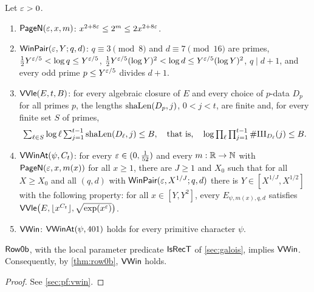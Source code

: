 \begin{definition}\label{def:window:vwin}
Let $\varepsilon>0$.
\begin{enumerate}[label=(\alph*)]
\item $\mathsf{PageN}(\varepsilon,x,m)$: $x^{2+8\varepsilon}\le2^m\le2x^{2+8\varepsilon}$.
\item $\mathsf{WinPair}(\varepsilon,Y;q,d)$: $q\equiv3\pmod8$ and $d\equiv7\pmod{16}$ are primes,
  $\frac12Y^{\varepsilon/5}<\log q\le Y^{\varepsilon/5}$, $\frac12Y^{\varepsilon/5}(\log Y)^2<\log d\le Y^{\varepsilon/5}(\log Y)^2$,
  $q\mid d+1$, and every odd prime $p\le Y^{\varepsilon/5}$ divides $d+1$.
\item $\mathsf{VVle}(E,t,B)$: for every algebraic closure of $E$ and every choice of $p$-data $D_p$ for all
  primes $p$, the lengths $\mathrm{shaLen}(D_p,j)$, $0<j<t$, are finite and, for every finite set $S$ of primes,
  \[\textstyle\sum_{\ell\in S}\log\ell\sum_{j=1}^{t-1}\mathrm{shaLen}(D_\ell,j)\le B,\quad\text{that is,}\quad
  \log\prod_{\ell}\prod_{j=1}^{t-1}\#\mathrm{III}_{D_\ell}(j)\le B.\]
\item $\mathsf{VWinAt}(\psi,C_t)$: for every $\varepsilon\in(0,\frac1{52})$ and every $m:\mathbb{R}\to\mathbb{N}$ with
  $\mathsf{PageN}(\varepsilon,x,m(x))$ for all $x\ge1$, there are $J\ge1$ and $X_0$ such that for all $X\ge X_0$ and all
  $(q,d)$ with $\mathsf{WinPair}(\varepsilon,X^{1/J};q,d)$ there is $Y\in[X^{1/J},X^{1/2}]$ with the following property:
  for all $x\in[Y,Y^2]$, every $E_{\psi,m(x),q,d}$ satisfies
  $\mathsf{VVle}\bigl(E,\lfloor x^{C_t}\rfloor,\sqrt{\exp(x^{\varepsilon})}\bigr)$.
\item $\mathsf{VWin}$: $\mathsf{VWinAt}(\psi,401)$ holds for every primitive character $\psi$.
\end{enumerate}
\end{definition}

\begin{theorem}\Fmark\label{thm:vwin}
$\mathsf{Row0b}$, with the local parameter predicate $\mathsf{IsRecT}$ of \cref{sec:galois}, implies
$\mathsf{VWin}$. Consequently, by \cref{thm:row0b}, $\mathsf{VWin}$ holds.
\end{theorem}
\begin{proof}See \cref{sec:pf:vwin}.
\end{proof}


